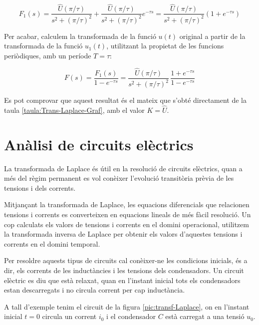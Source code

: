 \begin{exemple}[\CalcTransfLaplace{}]
    \[
        F_1(s) = \frac{\hat{U} (\pi/\tau)}{s^2 + (\pi/\tau)^2} +
        \frac{\hat{U} (\pi/\tau)}{s^2 + (\pi/\tau)^2} e^{-\tau s} =
        \frac{\hat{U} (\pi/\tau)}{s^2 + (\pi/\tau)^2} (1+e^{-\tau s})
    \]

    Per acabar, calculem la transformada de la funció $u(t)$ original a
    partir de la transformada de la funció $u_1(t)$, utilitzant la
    propietat de les funcions periòdiques, amb un període $T=\tau$:

    \[
        F(s) = \frac{F_1(s)}{1-e^{-\tau s}} =
        \frac{\hat{U} (\pi/\tau) }{s^2 + (\pi/\tau)^2}\,\frac{1+e^{-\tau s}}{1-e^{-\tau
        s}}
    \]

    Es pot comprovar que aquest resultat és el mateix que s'obté directament de la taula \vref{taula:Trans-Laplace-Graf}, amb el valor $K=\hat{U}$.
\end{exemple}

\section{Anàlisi de circuits elèctrics}

La transformada de Laplace és útil en la resolució de circuits
elèctrics, quan a més del règim permanent es vol conèixer
l'evolució transitòria prèvia de les tensions i dels corrents.

Mitjançant la transformada de Laplace, les equacions diferencials
que relacionen tensions i corrents es converteixen en equacions
lineals de més fàcil resolució. Un cop calculats els valors de
tensions i corrents en el domini operacional, utilitzem la
transformada inversa de Laplace per obtenir els valors d'aquestes
tensions i corrents en el domini temporal.

Per  resoldre aquests tipus de circuits cal conèixer-ne les
condicions inicials, és a dir, els corrents de les inductàncies i
les tensions dels condensadors. Un circuit elèctric es diu que està
relaxat, quan en l'instant inicial tots els condensadors estan
descarregats i no circula corrent per cap inductància.

A tall d'exemple tenim el circuit de la figura
\vref{pic:transf-Laplace}, on en l'instant inicial $t=0$ circula un
corrent $i_0$ i el condensador $C$ està carregat a una tensió $u_0$.

\begin{center}
    
    \label{pic:transf-Laplace}
\end{center}

